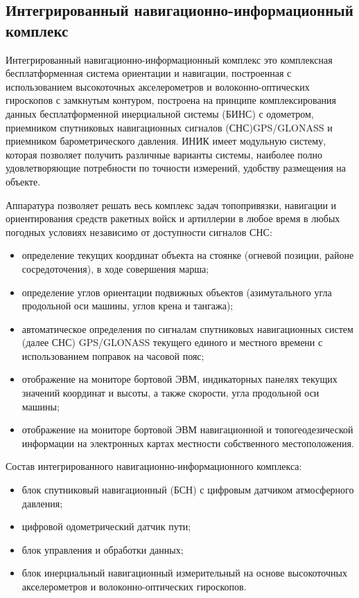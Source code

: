 \subsection{Интегрированный навигационно-информационный комплекс}
\label{sub:lit_review:ins}

Интегрированный навигационно-информационный комплекс это комплексная бесплатформенная система ориентации и навигации,
построенная с использованием высокоточных акселерометров и волоконно-оптических гироскопов с замкнутым контуром,
построена на принципе комплексирования данных бесплатформенной инерциальной системы (БИНС) с одометром, приемником спутниковых навигационных сигналов (СНС)\break GPS/GLONASS и приемником барометрического давления.
ИНИК имеет модульную систему, которая позволяет получить различные варианты системы, наиболее полно удовлетворяющие потребности по точности измерений, удобству размещения на объекте.

Аппаратура позволяет  решать весь комплекс задач топопривязки, навигации и ориентирования средств ракетных войск и артиллерии в любое время в любых погодных условиях независимо от доступности сигналов СНС:
\begin{itemize}
	\item определение текущих координат объекта на стоянке (огневой позиции, районе сосредоточения), в ходе
		совершения марша;
	\item определение углов ориентации подвижных объектов (азимутального угла продольной оси машины, углов крена и
		тангажа);
	\item автоматическое определения по сигналам спутниковых навигационных систем (далее СНС) GPS/GLONASS текущего
		единого и местного времени с использованием поправок на часовой пояс;
	\item отображение на мониторе бортовой ЭВМ, индикаторных панелях текущих значений координат и высоты, а также
		скорости, угла продольной оси машины;
	\item отображение на мониторе бортовой ЭВМ навигационной и топогеодезической информации на электронных картах
		местности собственного местоположения.
\end{itemize}

Состав интегрированного навигационно-информационного комплекса:
\begin{itemize}
	\item блок спутниковый навигационный (БСН) с цифровым датчиком атмосферного давления;
	\item цифровой одометрический датчик пути;
	\item блок управления и обработки данных;
	\item блок инерциальный навигационный измерительный на основе высокоточных акселерометров и волоконно-оптических
		гироскопов.
\end{itemize}

